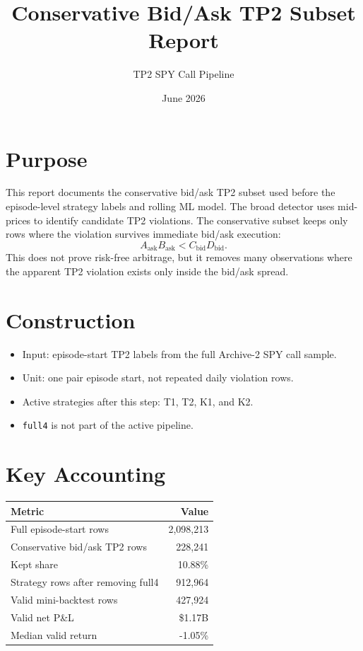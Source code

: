 \documentclass[11pt]{article}
\title{Conservative Bid/Ask TP2 Subset Report}
\author{TP2 SPY Call Pipeline}
\date{June 2026}
\begin{document}
\maketitle

\section*{Purpose}
This report documents the conservative bid/ask TP2 subset used before the
episode-level strategy labels and rolling ML model. The broad detector uses
mid-prices to identify candidate TP2 violations. The conservative subset keeps
only rows where the violation survives immediate bid/ask execution:
\[
 A_{\mathrm{ask}}B_{\mathrm{ask}} < C_{\mathrm{bid}}D_{\mathrm{bid}}.
\]
This does not prove risk-free arbitrage, but it removes many observations where
the apparent TP2 violation exists only inside the bid/ask spread.

\section*{Construction}
\begin{itemize}
  \item Input: episode-start TP2 labels from the full Archive-2 SPY call sample.
  \item Unit: one pair episode start, not repeated daily violation rows.
  \item Active strategies after this step: T1, T2, K1, and K2.
  \item \texttt{full4} is not part of the active pipeline.
\end{itemize}

\section*{Key Accounting}
\begin{center}
\begin{tabular}{lr}
\toprule
Metric & Value \\
\midrule
Full episode-start rows & 2,098,213 \\
Conservative bid/ask TP2 rows & 228,241 \\
Kept share & 10.88\% \\
Strategy rows after removing full4 & 912,964 \\
Valid mini-backtest rows & 427,924 \\
Valid net P\&L & \$1.17B \\
Median valid return & -1.05\% \\
\bottomrule
\end{tabular}
\end{center}
\end{document}
